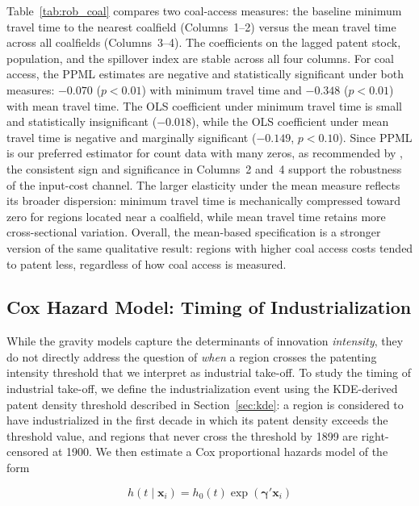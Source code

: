 \documentclass[letterpaper,12pt,leqno]{article}
\begin{document}
Table~\ref{tab:rob_coal} compares two coal-access measures: the baseline minimum travel time to the nearest coalfield (Columns~1--2) versus the mean travel time across all coalfields (Columns~3--4). The coefficients on the lagged patent stock, population, and the spillover index are stable across all four columns. For coal access, the PPML estimates are negative and statistically significant under both measures: \(-0.070\) (\(p < 0.01\)) with minimum travel time and \(-0.348\) (\(p < 0.01\)) with mean travel time. The OLS coefficient under minimum travel time is small and statistically insignificant (\(-0.018\)), while the OLS coefficient under mean travel time is negative and marginally significant (\(-0.149\), \(p < 0.10\)). Since PPML is our preferred estimator for count data with many zeros, as recommended by \citet{santos2006log}, the consistent sign and significance in Columns~2 and~4 support the robustness of the input-cost channel. The larger elasticity under the mean measure reflects its broader dispersion: minimum travel time is mechanically compressed toward zero for regions located near a coalfield, while mean travel time retains more cross-sectional variation. Overall, the mean-based specification is a stronger version of the same qualitative result: regions with higher coal access costs tended to patent less, regardless of how coal access is measured.



\subsection{Cox Hazard Model: Timing of Industrialization}
\label{sec:cox}

While the gravity models capture the determinants of innovation {\em intensity}, they do not directly address the question of {\em when} a region crosses the patenting intensity threshold that we interpret as industrial take-off. To study the timing of industrial take-off, we define the industrialization event using the KDE-derived patent density threshold described in Section~\ref{sec:kde}: a region is considered to have industrialized in the first decade in which its patent density exceeds the threshold value, and regions that never cross the threshold by 1899 are right-censored at 1900. We then estimate a Cox proportional hazards model of the form

\begin{equation}
  h(t \mid \mathbf{x}_i) = h_0(t) \exp(\boldsymbol{\gamma}' \mathbf{x}_i)
\end{equation}
\end{document}
